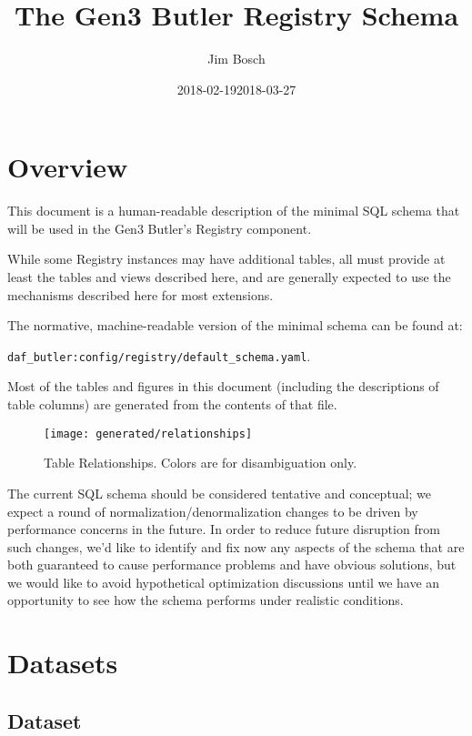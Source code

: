 \documentclass[DM,toc]{lsstdoc}
\title{The Gen3 Butler Registry Schema}
\author{Jim Bosch}
\date{2018-02-19}
\date{2018-03-27}
\begin{document}
\maketitle

\section{Overview}
\label{sec:overview}

This document is a human-readable description of the minimal SQL schema that will be used in the Gen3 Butler's Registry component.

While some Registry instances may have additional tables, all must provide at least the tables and views described here, and are generally expected to use the mechanisms described here for most extensions.

The normative, machine-readable version of the minimal schema can be found at:

\verb`daf_butler:config/registry/default_schema.yaml`.

Most of the tables and figures in this document (including the descriptions of table columns) are generated from the contents of that file.

\begin{figure}
    \centering
    \texttt{[image: generated/relationships]}
    \caption{Table Relationships.  Colors are for disambiguation only.}
    \label{fig:relationships}
\end{figure}

The current SQL schema should be considered tentative and conceptual; we expect a round of normalization/denormalization changes to be driven by performance concerns in the future.
In order to reduce future disruption from such changes, we'd like to identify and fix now any aspects of the schema that are both guaranteed to cause performance problems and have obvious solutions, but we would like to avoid hypothetical optimization discussions until we have an opportunity to see how the schema performs under realistic conditions.

\section{Datasets}
\label{sec:datasets}

\subsection{Dataset}
\label{sec:dataset}
\end{document}
